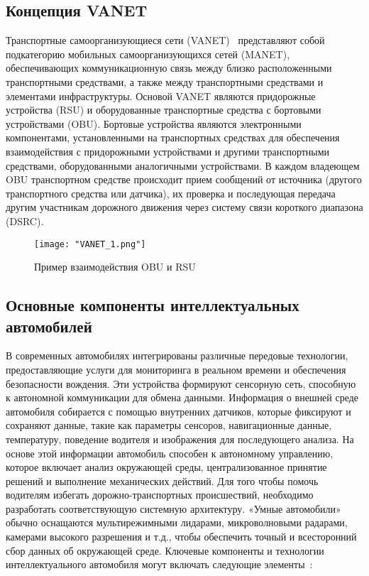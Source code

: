 \subsection*{Концепция VANET}

Транспортные самоорганизующиеся сети (VANET)~\cite{anwer2014survey} представляют собой подкатегорию мобильных самоорганизующихся сетей (MANET), обеспечивающих коммуникационную связь между близко расположенными транспортными средствами, а также между транспортными средствами и элементами инфраструктуры. Основой VANET являются придорожные устройства (RSU) и оборудованные транспортные средства с бортовыми устройствами (OBU). Бортовые устройства являются электронными компонентами, установленными на транспортных средствах для обеспечения взаимодействия с придорожными устройствами и другими транспортными средствами, оборудованными аналогичными устройствами. В каждом владеющем OBU транспортном средстве происходит прием сообщений от источника (другого транспортного средства или датчика), их проверка и последующая передача другим участникам дорожного движения через систему связи короткого диапазона (DSRC).

\begin{figure}[!h]
    \centering
    \texttt{[image: "VANET\_1.png"]}
    \caption{Пример взаимодействия OBU и RSU}
    \label{fig:vanet}
\end{figure}

\subsection*{Основные компоненты интеллектуальных автомобилей}

В современных автомобилях интегрированы различные передовые технологии, предоставляющие услуги для мониторинга в реальном времени и обеспечения безопасности вождения. Эти устройства формируют сенсорную сеть, способную к автономной коммуникации для обмена данными.
Информация о внешней среде автомобиля собирается с помощью внутренних датчиков, которые фиксируют и сохраняют данные, такие как параметры сенсоров, навигационные данные, температуру, поведение водителя и изображения для последующего анализа. На основе этой информации автомобиль способен к автономному управлению, которое включает анализ окружающей среды, централизованное принятие решений и выполнение механических действий. Для того чтобы помочь водителям избегать дорожно-транспортных происшествий, необходимо разработать соответствующую системную архитектуру. «Умные автомобили» обычно оснащаются мультирежимными лидарами, микроволновыми радарами, камерами высокого разрешения и т.д., чтобы обеспечить точный и всесторонний сбор данных об окружающей среде. Ключевые компоненты и технологии интеллектуального автомобиля могут включать следующие элементы~\cite{raza2019survey}:

